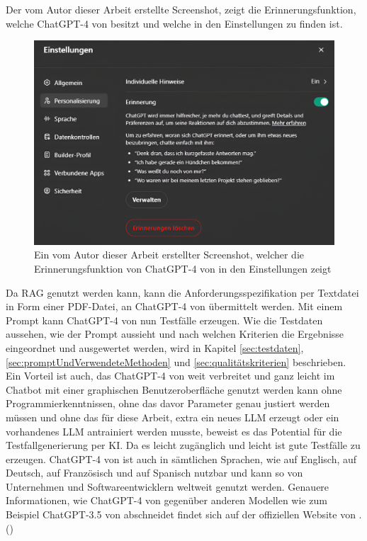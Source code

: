 \documentclass[12pt,toc=bib,toc=listof]{scrreprt}
\begin{document}
\noindent Der vom Autor dieser Arbeit erstellte Screenshot, zeigt die Erinnerungsfunktion, welche ChatGPT-4 von \textcite{OpenAI2025} besitzt und welche in den Einstellungen zu finden ist.

\begin{figure}[H]
    \centering
    \includegraphics[width=1\linewidth]{./Bilder/OpenAI_Erinnerungsfunktion ChatGPT-4.png}
    \caption{Ein vom Autor dieser Arbeit erstellter Screenshot, welcher die Erinnerungsfunktion von ChatGPT-4 von \textcite{OpenAI2025} in den Einstellungen zeigt}
    \label{fig:enter-label}
\end{figure}
\noindent Da RAG genutzt werden kann, kann die Anforderungsspezifikation per Textdatei in Form einer PDF-Datei, an ChatGPT-4 von \textcite{OpenAI2025} übermittelt werden. Mit einem Prompt kann ChatGPT-4 von \textcite{OpenAI2025} nun Testfälle erzeugen. Wie die Testdaten aussehen, wie der Prompt aussieht und nach welchen Kriterien die Ergebnisse eingeordnet und ausgewertet werden, wird in Kapitel \ref{sec:testdaten}, \ref{sec:promptUndVerwendeteMethoden} und \ref{sec:qualitätskriterien} beschrieben. Ein Vorteil ist auch, das ChatGPT-4 von \textcite{OpenAI2025} weit verbreitet und ganz leicht im Chatbot mit einer graphischen Benutzeroberfläche genutzt werden kann ohne Programmierkenntnissen, ohne das davor Parameter genau justiert werden müssen und ohne das für diese Arbeit, extra ein neues LLM erzeugt oder ein vorhandenes LLM antrainiert werden musste, beweist es das Potential für die Testfallgenerierung per KI. Da es leicht zugänglich und leicht ist gute Testfälle zu erzeugen. ChatGPT-4 von \textcite{OpenAI2025} ist auch in sämtlichen Sprachen, wie auf Englisch, auf Deutsch, auf Französisch und auf Spanisch nutzbar und kann so von Unternehmen und Softwareentwicklern weltweit genutzt werden. Genauere Informationen, wie ChatGPT-4 von \textcite{OpenAI2025} gegenüber anderen Modellen wie zum Beispiel ChatGPT-3.5 von \textcite{OpenAI2025} abschneidet findet sich auf der offiziellen Website von \textcite{OpenAI2025}. (\cite{OpenAI2025}) 
\end{document}
